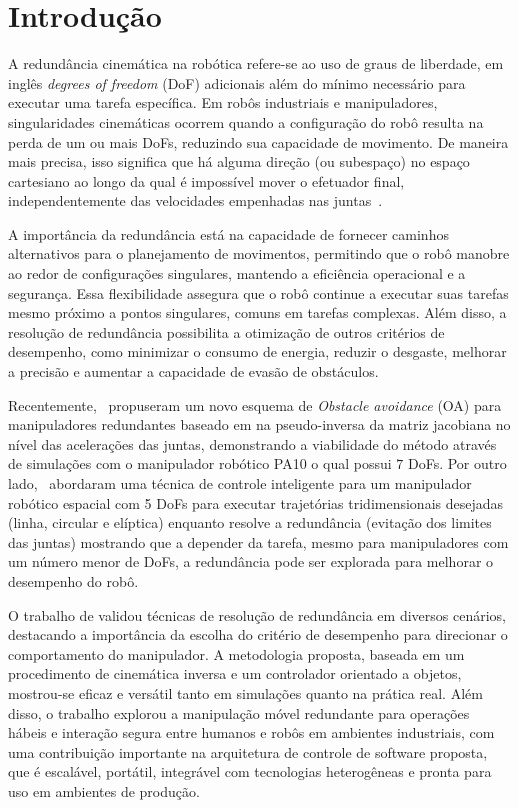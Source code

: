 \chapter{Introdução}\label{cap:introduction}

A redundância cinemática na robótica refere-se ao uso de graus de liberdade, em inglês \emph{degrees of freedom} (DoF) adicionais além do mínimo necessário para executar uma
tarefa específica. Em robôs industriais e manipuladores, singularidades cinemáticas ocorrem quando a configuração do robô resulta na perda
de um ou mais DoFs, reduzindo sua capacidade de movimento. De maneira mais precisa, isso significa que há alguma direção (ou subespaço) 
no espaço cartesiano ao longo da qual é impossível mover o efetuador final, independentemente das velocidades empenhadas nas 
juntas~\cite{craig2004}. 

A importância da redundância está na capacidade de fornecer caminhos alternativos para o planejamento de movimentos,
permitindo que o robô manobre ao redor de configurações singulares, mantendo a eficiência operacional e a segurança. Essa flexibilidade 
assegura que o robô continue a executar suas tarefas mesmo próximo a pontos singulares, comuns em tarefas complexas. Além disso, a resolução
de redundância possibilita a otimização de outros critérios de desempenho, como minimizar o consumo de energia, reduzir o desgaste, melhorar 
a precisão e aumentar a capacidade de evasão de obstáculos.

Recentemente,~\cite{li2023pseudo} propuseram um novo esquema de \emph{Obstacle avoidance} (OA) para manipuladores redundantes 
baseado em na pseudo-inversa da matriz jacobiana no nível das acelerações das juntas, demonstrando a viabilidade do método através de simulações 
com o manipulador robótico PA10 o qual possui \(7\) DoFs. Por outro lado,~\cite{kuri2023som}
abordaram uma técnica de controle inteligente para um manipulador robótico espacial com 5 DoFs para executar
trajetórias tridimensionais desejadas (linha, circular e elíptica) enquanto resolve a redundância 
(evitação dos limites das juntas) mostrando que a depender da tarefa, mesmo para manipuladores com um número menor de DoFs, 
a redundância pode ser explorada para melhorar o desempenho do robô.

O trabalho de \cite{ancona2017} validou técnicas de resolução de redundância em diversos cenários, destacando a importância da escolha do critério de desempenho
para direcionar o comportamento do manipulador. A metodologia proposta, baseada em um procedimento de cinemática inversa e um controlador orientado a objetos,
mostrou-se eficaz e versátil tanto em simulações quanto na prática real. Além disso, o trabalho explorou a manipulação móvel redundante para operações hábeis 
e interação segura entre humanos e robôs em ambientes industriais, com uma contribuição importante na arquitetura de controle de software proposta, que é escalável,
portátil, integrável com tecnologias heterogêneas e pronta para uso em ambientes de produção.

